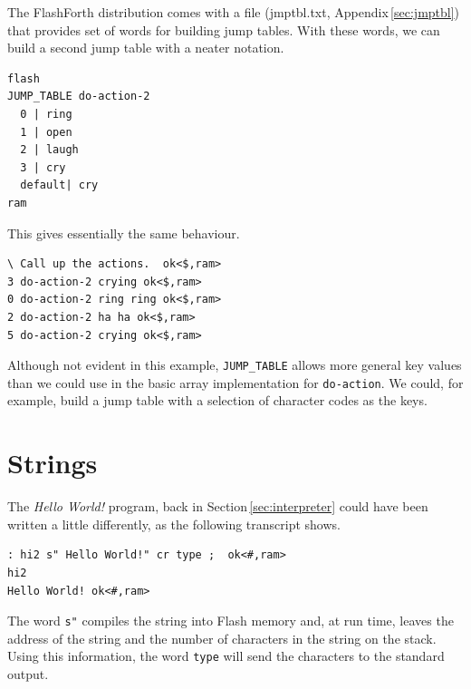\documentclass[12pt,a4paper]{article}
\begin{document}
\medskip
The FlashForth distribution comes with a file (jmptbl.txt, Appendix\,\ref{sec:jmptbl})
that provides set of words for building jump tables.
With these words, we can build a second jump table with a neater notation.
\begin{verbatim}
flash
JUMP_TABLE do-action-2
  0 | ring
  1 | open
  2 | laugh 
  3 | cry
  default| cry
ram
\end{verbatim}
This gives essentially the same behaviour.
\begin{verbatim}
\ Call up the actions.  ok<$,ram>
3 do-action-2 crying ok<$,ram>
0 do-action-2 ring ring ok<$,ram>
2 do-action-2 ha ha ok<$,ram>
5 do-action-2 crying ok<$,ram>
\end{verbatim}
Although not evident in this example, \verb!JUMP_TABLE! allows more general key values
than we could use in the basic array implementation for \verb!do-action!.
We could, for example, build a jump table with a selection of character codes as the keys.

\newpage
\section{Strings}
%
The \textit{Hello World!} program, back in Section\,\ref{sec:interpreter}
could have been written a little differently, as the following transcript shows.
\begin{verbatim}
: hi2 s" Hello World!" cr type ;  ok<#,ram>
hi2 
Hello World! ok<#,ram>
\end{verbatim}
The word \verb!s"! compiles the string into Flash memory and, at run time,
leaves the address of the string and the number of characters in the string
on the stack.
Using this information, the word \verb!type! will send the characters to the standard output. 

\medskip
\end{document}
